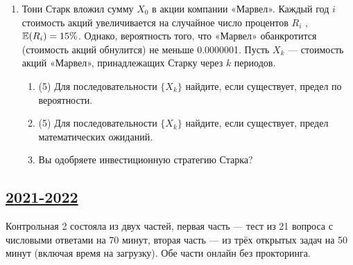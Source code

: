\begin{enumerate}
	\item Тони Старк вложил сумму $X_0$ в акции компании «Марвел». Каждый год $i$ стоимость акций увеличивается на случайное число процентов $R_i$ , $\operatorname{\mathbb{E}}(R_i )=15\%$. Однако, вероятность того, что «Марвел» обанкротится (стоимость акций обнулится) не меньше 0.0000001. 
	Пусть $X_k$ — стоимость акций «Марвел», принадлежащих Старку через $k$ периодов. 
	
	\begin{enumerate}
		\item (5) Для последовательности $\{X_k\}$ найдите, если существует, предел по вероятности.
		\item (5) Для последовательности $\{X_k\}$ найдите, если существует, предел математических ожиданий. 
		\item Вы одобряете инвестиционную стратегию Старка?
	\end{enumerate}
	
\end{enumerate}



\subsection[2021-2022]{\hyperref[sec:sol_kr_02_2021_2022]{2021-2022}}
\label{sec:kr_02_2021_2022}

Контрольная 2 состояла из двух частей, первая часть — тест из 21 вопроса с числовыми ответами на 70 минут,
вторая часть — из трёх открытых задач на 50 минут (включая время на загрузку). 
Обе части онлайн без прокторинга. 

